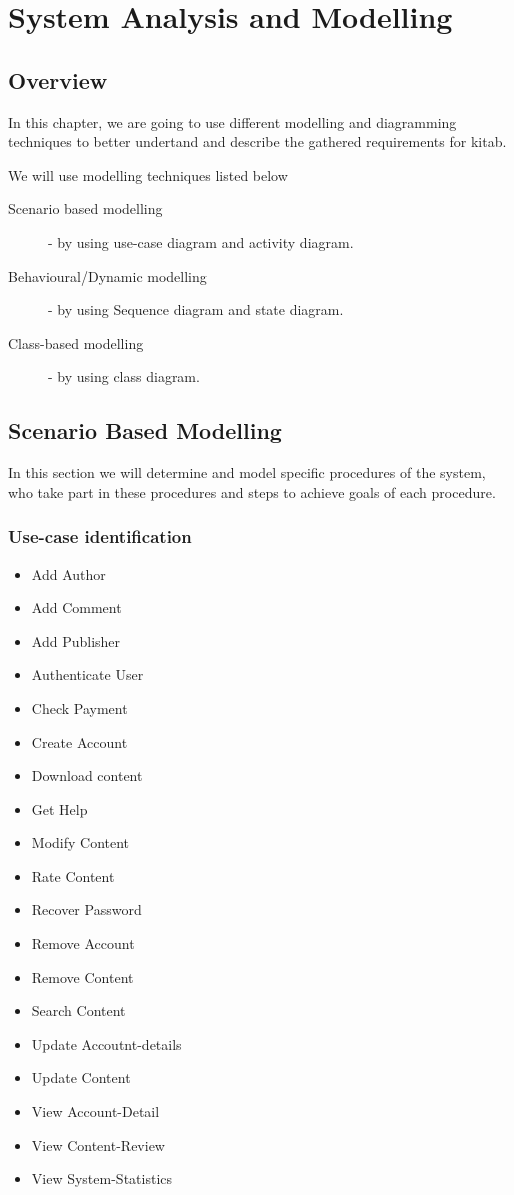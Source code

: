 \chapter{System Analysis and Modelling}
\section{Overview}

In this chapter, we are going to use different modelling and diagramming techniques to better undertand and describe the gathered requirements for kitab.

We will use modelling techniques listed below

	\begin{description}
		\item[Scenario based modelling] - by using use-case diagram and activity diagram.
		\item[Behavioural/Dynamic modelling] - by using Sequence diagram and state diagram.
		\item[Class-based modelling] - by using class diagram.
	\end{description}

\section{Scenario Based Modelling}

In this section we will determine and model specific procedures of the system, who take part in these procedures and steps to achieve goals of each procedure.

	\subsection{Use-case identification}

	\begin{itemize}
		\item Add Author
		\item Add Comment
		\item Add Publisher
		\item Authenticate User
		\item Check Payment
		\item Create Account
		\item Download content
		\item Get Help
		\item Modify Content
		\item Rate Content
		\item Recover Password
		\item Remove Account
		\item Remove Content
		\item Search Content
		\item Update Accoutnt-details
		\item Update Content
		\item View Account-Detail
		\item View Content-Review
		\item View System-Statistics
	\end{itemize}


